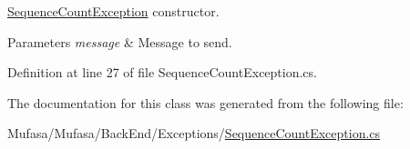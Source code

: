 \hyperlink{class_mufasa_1_1_back_end_1_1_exceptions_1_1_sequence_count_exception}{Sequence\+Count\+Exception} constructor. 


\begin{DoxyParams}{Parameters}
{\em message} & Message to send.\\
\hline
\end{DoxyParams}


Definition at line 27 of file Sequence\+Count\+Exception.\+cs.



The documentation for this class was generated from the following file\+:\begin{DoxyCompactItemize}
\item 
Mufasa/\+Mufasa/\+Back\+End/\+Exceptions/\hyperlink{_sequence_count_exception_8cs}{Sequence\+Count\+Exception.\+cs}\end{DoxyCompactItemize}
